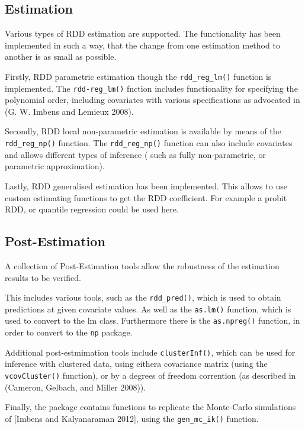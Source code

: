 \documentclass[article]{jss}
\begin{document}
\subsection{Estimation}\label{estimation}

Various types of RDD estimation are supported. The functionality has
been implemented in such a way, that the change from one estimation
method to another is as small as possible.

Firstly, RDD parametric estimation though the \texttt{rdd\_reg\_lm()}
function is implemented. The \texttt{rdd-reg\_lm()} fnction includes
functionality for specifying the polynomial order, including covariates
with various specifications as advocated in (G. W. Imbens and Lemieux
2008).

Secondly, RDD local non-parametric estimation is available by means of
the \texttt{rdd\_reg\_np()} function. The \texttt{rdd\_reg\_np()}
function can also include covariates and allows different types of
inference ( such as fully non-parametric, or parametric approximation).

Lastly, RDD generalised estimation has been implemented. This allows to
use custom estimating functions to get the RDD coefficient. For example
a probit RDD, or quantile regression could be used here.

\subsection{Post-Estimation}\label{post-estimation}

A collection of Post-Estimation tools allow the robustness of the
estimation results to be verified.

This includes various tools, such as the \texttt{rdd\_pred()}, which is
used to obtain predictions at given covariate values. As well as the
\texttt{as.lm()} function, which is used to convert to the lm class.
Furthermore there is the \texttt{as.npreg()} function, in order to
convert to the \texttt{np} package.

Additional post-estmimation tools include \texttt{clusterInf()}, which
can be used for inference with clustered data, using eithera covariance
matrix (using the \texttt{vcovCluster()} function), or by a degrees of
freedom corrention (as described in (Cameron, Gelbach, and Miller
2008)).

Finally, the package contains functions to replicate the Monte-Carlo
simulations of {[}Imbens and Kalyanaraman 2012{]}, using the
\texttt{gen\_mc\_ik()} function.
\end{document}

